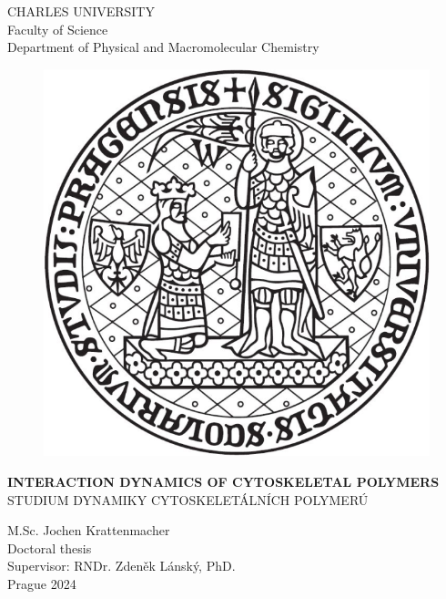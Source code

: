 \thispagestyle{empty}
\begin{center}
    \LARGE{CHARLES UNIVERSITY} \\
    \vspace{0.2in}
    \large{Faculty of Science} \\
    \vspace{0.2in}
    \large{Department of Physical and Macromolecular Chemistry} \\
    \vspace{0.4in}
    \begin{figure}[h!tb]
        \centering
        \includegraphics[scale=0.6]{Figures/CharlesU.png}
    \end{figure}
    \vspace{0.4in}
    \uppercase{\LARGE{\bf{Interaction dynamics of cytoskeletal polymers}}} \\
    \vspace{0.2in}
    \uppercase{\Large{Studium dynamiky cytoskeletálních POLYMERÚ}} \\
    \vspace{0.4in}

    \large{M.Sc. Jochen Krattenmacher} \\
    \vspace{0.1in}
    \large{Doctoral thesis} \\
    \vspace{0.1in}
    \large{Supervisor: RNDr. Zdeněk Lánský, PhD.} \\
    \vspace{0.1in}
    \large{Prague 2024}
\end{center}